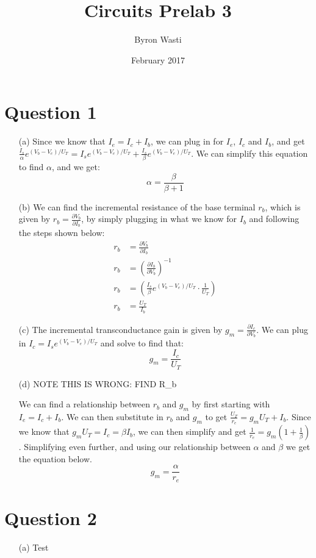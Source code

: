 \documentclass{article}
\title{Circuits Prelab 3}
\author{Byron Wasti}
\date{February 2017}
\begin{document}
\maketitle

\section{Question 1}
\begin{itemize}
    \item [(a)] 
        Since we know that $I_e = I_c + I_b$, we can plug in for $I_e$, $I_c$ and $I_b$, and get $\frac{I_s}{\alpha}e^{(V_b - V_e)/U_T} = I_se^{(V_b - V_e)/U_T} + \frac{I_s}{\beta}e^{(V_b - V_e)/U_T}$. We can simplify this equation to find $\alpha$, and we get:
        \begin{equation*}
            \alpha = \frac{\beta}{\beta + 1}
        \end{equation*}

    \item [(b)]
        We can find the incremental resistance of the base terminal $r_b$, which is given by $r_b = \frac{\partial V_b}{\partial I_b}$, by simply plugging in what we know for $I_b$ and following the steps shown below:
        \begin{align*}
            r_b &= \frac{\partial V_b}{\partial I_b}\\
            r_b &= \left(\frac{\partial I_b}{\partial V_b}\right)^{-1}\\
            r_b &= \left( \frac{I_s}{\beta}e^{(V_b - V_e)/U_T}\cdot \frac{1}{U_T} \right)\\
            r_b &= \frac{U_T}{I_b}
        \end{align*}

    \item [(c)]
        The incremental transconductance gain is given by $g_m = \frac{ \partial I_c }{ \partial V_b }$. We can plug in $I_c = I_se^{(V_b - V_e)/U_T}$ and solve to find that:
        \begin{equation*}
            g_m = \frac{ I_c }{ U_T }
        \end{equation*}

    \item [(d)]
        NOTE THIS IS WRONG: FIND R_b


        We can find a relationship between $r_b$ and $g_m$ by first starting with $I_e = I_c + I_b$. We can then substitute in $r_b$ and $g_m$ to get $\frac{U_T}{r_e} = g_mU_T + I_b$. Since we know that $g_mU_T = I_c = \beta I_b$, we can then simplify and get $\frac{1}{r_e} = g_m (1 + \frac{1}{\beta})$. Simplifying even further, and using our relationship between $\alpha$ and $\beta$ we get the equation below.
        \begin{equation*}
            g_m = \frac{\alpha}{r_e}
        \end{equation*}

\end{itemize}

\section{Question 2}
\begin{itemize}
    \item[(a)] Test

\end{itemize}
\end{document}
